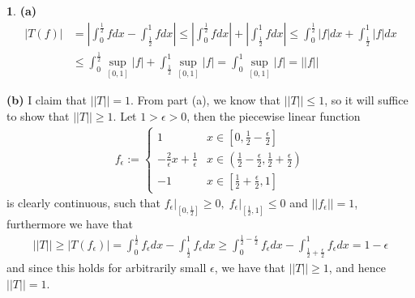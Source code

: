 \documentclass[10.5pt]{article}
\theoremstyle{definition}
\newtheorem{pb}{}
\newcommand{\abs}[1]{\left\vert#1\right\vert}
\newcommand{\norm}[1]{\lvert\lvert#1\rvert\rvert}
\begin{document}
        \begin{pb}
            \textbf{(a)}
            \begin{align*}
                \abs{T(f)} &= \abs{\int_0^{\frac12} fdx - \int_{\frac12}^1 fdx} \leq\abs{\int_0^{\frac12}fdx} + \abs{\int_{\frac12}^1fdx} \leq \int_0^{\frac12}\abs{f}dx + \int_{\frac12}^1\abs{f}dx \\
                &\leq \int_0^{\frac12}\sup_{[0,1]}\abs{f} + \int_{\frac12}^1\sup_{[0,1]}\abs{f} = \int_0^1 \sup_{[0,1]}\abs{f} = \norm{f}
            \end{align*}

            \textbf{(b)} I claim that \(\norm{T} = 1\). From part (a), we know that \(\norm{T} \leq 1\), so it will suffice to show that \(\norm{T} \geq 1\). Let \(1 > \epsilon > 0\), then the piecewise linear function
            \begin{align*}
                f_\epsilon := \begin{cases}
                    1 & x \in [0, \frac12 - \frac{\epsilon}{2}] \\
                    -\frac{2}{\epsilon}x + \frac{1}{\epsilon} & x \in (\frac12 - \frac{\epsilon}{2}, \frac12 + \frac{\epsilon}{2}) \\
                    -1 & x \in [\frac12 + \frac{\epsilon}{2}, 1]
                \end{cases}
            \end{align*}
            is clearly continuous, such that \(f_\epsilon\vert_{[0,\frac12]} \geq 0, \; f_\epsilon\vert_{[\frac12,1]} \leq 0\) and \(\norm{f_\epsilon} = 1\), furthermore we have that
            \begin{align*}
                \norm{T} \geq \abs{T(f_\epsilon)} = \int_0^{\frac12}f_\epsilon dx - \int_{\frac12}^1f_\epsilon dx \geq \int_0^{\frac12 - \frac{\epsilon}{2}}f_\epsilon dx - \int_{\frac12 + \frac{\epsilon}{2}}^1f_\epsilon dx = 1 - \epsilon
            \end{align*}
            and since this holds for arbitrarily small \(\epsilon\), we have that \(\norm{T} \geq 1\), and hence \(\norm{T} = 1\).


\end{pb}
\end{document}

